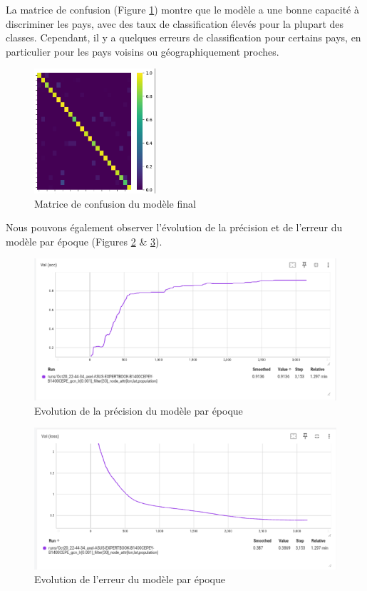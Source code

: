 La matrice de confusion (Figure \ref{fig:matrix-f30}) montre que le modèle a
une bonne capacité à discriminer les pays, avec des taux de classification
élevés pour la plupart des classes. Cependant, il y a quelques erreurs de
classification pour certains pays, en particulier pour les pays voisins ou
géographiquement proches.\\
\begin{figure}[h!]
    \centering
    \includegraphics[width=0.4\textwidth]{content/img/final-matrix.png}
    \caption{Matrice de confusion du modèle final}
    \label{fig:matrix-f30}
\end{figure}


Nous pouvons également observer l'évolution de la précision et de l'erreur du
modèle par époque (Figures \ref{fig:acc-evol} \& \ref{fig:loss-evol}).\\

\begin{figure}[h!]
    \centering
    \includegraphics[width=\textwidth]{content/img/final-acc-evol.png}
    \caption{Evolution de la précision du modèle par époque}
    \label{fig:acc-evol}
\end{figure}

\begin{figure}[h!]
    \centering
    \includegraphics[width=\textwidth]{content/img/final-loss-evol.png}
    \caption{Evolution de l'erreur du modèle par époque}
    \label{fig:loss-evol}
\end{figure}


